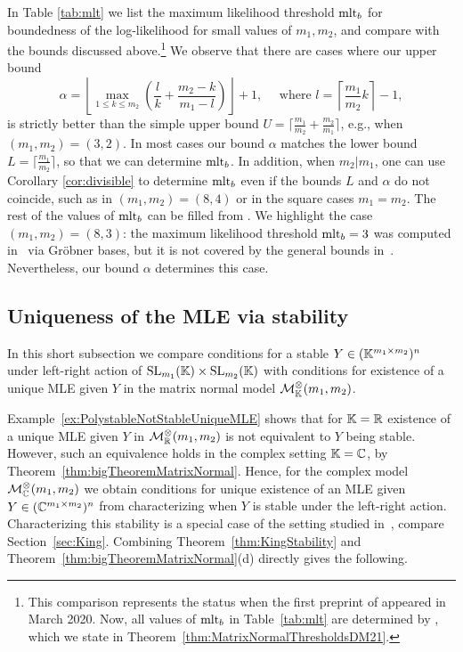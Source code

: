In Table \ref{tab:mlt} we list the maximum likelihood threshold $\operatorname{mlt}_b$ for boundedness  of the log-likelihood for small values of $m_1, m_2$, and compare with the bounds discussed above.\footnote{This comparison represents the status when the first preprint of \cite{SiagaPaper} appeared in March 2020. Now, all values of $\operatorname{mlt}_b$ in Table~\ref{tab:mlt} are determined by \cite[Theorem~1.3]{DM21MatrixNormal}, which we state in Theorem~\ref{thm:MatrixNormalThresholdsDM21}.}
We observe that there are cases where our upper bound 
\[\alpha = \left\lfloor \max \limits_{1\leq k \leq m_2} \left(\frac{l}{k} + \frac{m_2-k}{m_1 - l}\right) \right\rfloor +1, \quad \text{ where } l = \left\lceil \frac{m_1}{m_2} k \right\rceil - 1,
\]
is strictly better than the simple upper bound $U =\lceil \frac{m_1}{m_2} + \frac{m_2}{m_1} \rceil$, e.g.,  when $(m_1,m_2)=(3,2)$. 
In most cases our bound $\alpha$ matches the lower bound $L=\lceil \frac{m_1}{m_2} \rceil$, so that we can determine $\operatorname{mlt}_b$.
In addition, when $m_2 | m_1$, one can use Corollary \ref{cor:divisible} to determine $\operatorname{mlt}_b$ even if the bounds $L$ and $\alpha$ do not coincide, such as in $(m_1,m_2)=(8,4)$ or in the square cases $m_1=m_2$. The rest of the values of $\operatorname{mlt}_b$ can be filled from \cite[Table~1]{DrtonKurikiHoff}. 
We highlight the case $(m_1, m_2) = (8,3)$:
the maximum likelihood threshold $\operatorname{mlt}_b = 3$ was computed in~\cite{DrtonKurikiHoff} via Gr\"obner bases, 
but it is not covered by the general bounds in~\cite{DrtonKurikiHoff}.
Nevertheless, our bound $\alpha$ determines this case.


\subsection{Uniqueness of the MLE via stability}

In this short subsection we compare conditions for a stable $Y \in (\mathbb K^{m_1 \times m_2})^n$ under left-right action of $\operatorname{SL}_{m_1}(\mathbb K) \times \operatorname{SL}_{m_2}(\mathbb K)$ with conditions for existence of a unique MLE given $Y$ in the matrix normal model $\mathcal{M}^{\otimes}_{\mathbb K}(m_1,m_2)$.

Example~\ref{ex:PolystableNotStableUniqueMLE} shows that for $\mathbb K = \mathbb R$  existence of a unique MLE given $Y$ in $\mathcal{M}^{\otimes}_{\mathbb R}(m_1,m_2)$ is not equivalent to $Y$ being stable.
However, such an equivalence holds in the complex setting $\mathbb K = \mathbb C$, by  Theorem~\ref{thm:bigTheoremMatrixNormal}.
Hence, for the complex model $\mathcal{M}^{\otimes}_{\mathbb C}(m_1,m_2)$ we obtain conditions for unique existence of an MLE given $Y \in (\mathbb C^{m_1 \times m_2})^n$ from characterizing when $Y$ is stable under the left-right action.
Characterizing this stability is a special case of the setting studied in~\cite{King}, compare Section~\ref{sec:King}. Combining Theorem~\ref{thm:KingStability} and Theorem~\ref{thm:bigTheoremMatrixNormal}(d) directly gives the following.

